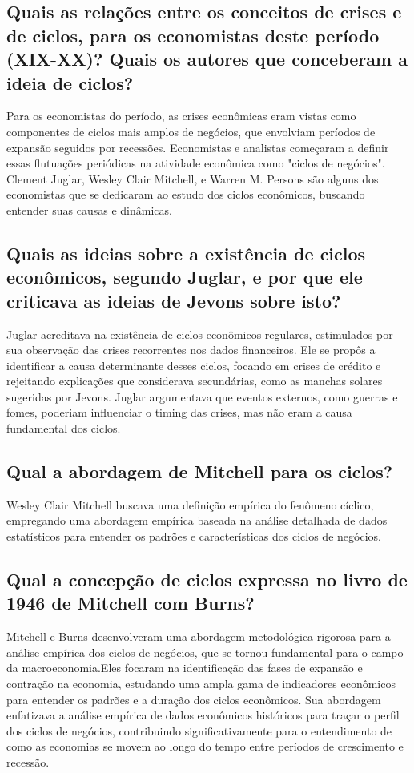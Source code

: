 \documentclass[a4paper,12pt]{article}[abntex2]
\begin{document}
\subsection{\textbf{Quais as relações entre os conceitos de crises e de ciclos, para os economistas deste período (XIX-XX)? Quais os autores que conceberam a ideia de ciclos?}}
Para os economistas do período, as crises econômicas eram vistas como componentes de ciclos mais amplos de negócios, que envolviam períodos de expansão seguidos por recessões. Economistas e analistas começaram a definir essas flutuações periódicas na atividade econômica como "ciclos de negócios". Clement Juglar, Wesley Clair Mitchell, e Warren M. Persons são alguns dos economistas que se dedicaram ao estudo dos ciclos econômicos, buscando entender suas causas e dinâmicas.
\subsection{\textbf{Quais as ideias sobre a existência de ciclos econômicos, segundo Juglar, e por que ele criticava as ideias de Jevons sobre isto?}}
Juglar acreditava na existência de ciclos econômicos regulares, estimulados por sua observação das crises recorrentes nos dados financeiros. Ele se propôs a identificar a causa determinante desses ciclos, focando em crises de crédito e rejeitando explicações que considerava secundárias, como as manchas solares sugeridas por Jevons. Juglar argumentava que eventos externos, como guerras e fomes, poderiam influenciar o timing das crises, mas não eram a causa fundamental dos ciclos.
\subsection{\textbf{Qual a abordagem de Mitchell para os ciclos?}}
Wesley Clair Mitchell buscava uma definição empírica do fenômeno cíclico, empregando uma abordagem empírica baseada na análise detalhada de dados estatísticos para entender os padrões e características dos ciclos de negócios.
\subsection{\textbf{Qual a concepção de ciclos expressa no livro de 1946 de Mitchell com Burns?}}
Mitchell e Burns desenvolveram uma abordagem metodológica rigorosa para a análise empírica dos ciclos de negócios, que se tornou fundamental para o campo da macroeconomia.Eles focaram na identificação das fases de expansão e contração na economia, estudando uma ampla gama de indicadores econômicos para entender os padrões e a duração dos ciclos econômicos. Sua abordagem enfatizava a análise empírica de dados econômicos históricos para traçar o perfil dos ciclos de negócios, contribuindo significativamente para o entendimento de como as economias se movem ao longo do tempo entre períodos de crescimento e recessão.
\end{document}
